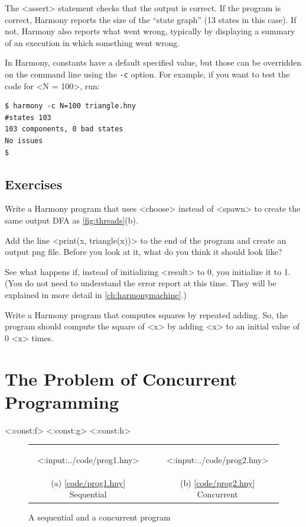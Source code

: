 \documentclass{report}
\newcommand{\harmonylink}[1]{%
[\href{https://harmony.cs.cornell.edu/#1}{\underline{#1}}]%
}
\newenvironment{code}{
\tcolorbox
}{
\endtcolorbox
}
\begin{document}
The <{assert}> statement checks that the output is
correct.  If the program is correct, Harmony reports the size of the
``state graph'' (13 states in this case).  If not, Harmony also
reports what went wrong, typically by displaying a summary of an execution in
which something went wrong.

In Harmony, constants have a default specified value,
but those can be overridden on the command
line using the \texttt{-c} option.
%
For example, if you want to test the code for <{N = 100}>, run:
\begin{code}
\begin{verbatim}
$ harmony -c N=100 triangle.hny
#states 103
103 components, 0 bad states
No issues
$
\end{verbatim}
\end{code}

\section*{Exercises}
\begin{problems}
\item Write a Harmony program that uses <{choose}> instead of <{spawn}> to create the same
output DFA as \autoref{fig:threads}(b).
\item Add the line <{print(x, triangle(x))}> to the end of the
program and create an output png file.  Before you look at it, what
do you think it should look like?
\item See what happens if, instead of initializing <{result}> to 0,
you initialize it to 1.  (You do not need to understand the error report at this time.  They will be explained in more detail in \autoref{ch:harmonymachine}.)
\item Write a Harmony program that computes squares by repeated adding.  So, the program
should compute the square of <{x}> by adding <{x}> to an initial value of 0 <{x}> times.
\end{problems}

\chapter{The Problem of Concurrent Programming}
\label{ch:concurrent}

<{:const:f}>
<{:const:g}>
<{:const:h}>

\begin{figure}[h]
\begin{center}
\begin{tabular}{ccc}
\begin{tcolorbox}[width=0.4\linewidth]
<{:input:../code/prog1.hny}>
\end{tcolorbox}
& \rule{0.05\linewidth}{0in} &
\begin{tcolorbox}[width=0.4\linewidth]
<{:input:../code/prog2.hny}>
\end{tcolorbox}
\\
(a) \harmonylink{code/prog1.hny} Sequential && (b) \harmonylink{code/prog2.hny} Concurrent
\end{tabular}
\end{center}
\caption{A sequential and a concurrent program}
\label{fig:progs}
\end{figure}
\end{document}
